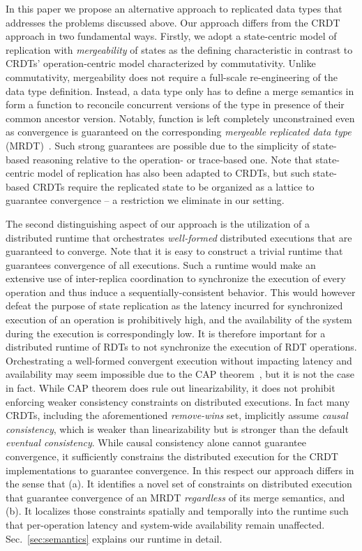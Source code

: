 In this paper we propose an alternative approach to replicated data types
that addresses the problems discussed above. Our approach differs from the
CRDT approach in two fundamental ways. Firstly, we adopt a state-centric
model of replication with \emph{mergeability} of states as the defining
characteristic in contrast to CRDTs' operation-centric model characterized
by commutativity. Unlike commutativity, mergeability does not require a
full-scale re-engineering of the data type definition. Instead,
a data type only has to define a merge semantics in form a 
function to reconcile concurrent versions of the type in presence of their
common ancestor version. Notably,  function is left completely
unconstrained even as convergence is guaranteed on the corresponding
\emph{mergeable replicated data type} (MRDT)~\cite{mrdt}. Such strong
guarantees are possible due to the simplicity of state-based reasoning
relative to the operation- or trace-based one. Note that state-centric
model of replication has also been adapted to CRDTs, but such state-based
CRDTs require the replicated state to be organized as a lattice to
guarantee convergence -- a restriction we eliminate in our setting. 

The second distinguishing aspect of our approach is the utilization of a
distributed runtime that orchestrates \emph{well-formed} distributed
executions that are guaranteed to converge. Note that it is easy to
construct a trivial runtime that guarantees convergence of all executions.
Such a runtime would make an extensive use of inter-replica coordination to
synchronize the execution of every operation and thus induce a
sequentially-consistent behavior. This would however defeat the purpose of
state replication as the latency incurred for synchronized execution of an
operation is prohibitively high, and the availability of the system during
the execution is correspondingly low. It is therefore important for a
distributed runtime of RDTs to not synchronize the execution of RDT
operations. Orchestrating a well-formed convergent execution without
impacting latency and availability may seem impossible due to the CAP
theorem~\cite{cap}, but it is not the case in fact. While CAP theorem does
rule out linearizability, it does not prohibit enforcing weaker consistency
constraints on distributed executions. In fact many CRDTs, including the
aforementioned \emph{remove-wins} set, implicitly assume \emph{causal
consistency}, which is weaker than linearizability but is stronger than the
default \emph{eventual consistency}. While causal consistency alone cannot
guarantee convergence, it sufficiently constrains the distributed execution
for the CRDT implementations to guarantee convergence. In this respect our
  approach differs in the sense that (a). It identifies a novel set of
  constraints on distributed execution that guarantee convergence of an
  MRDT \emph{regardless} of its merge semantics, and (b). It localizes
  those constraints spatially and temporally into the runtime such that
  per-operation latency and system-wide availability remain unaffected.
Sec.~\ref{sec:semantics} explains our runtime in detail. 

